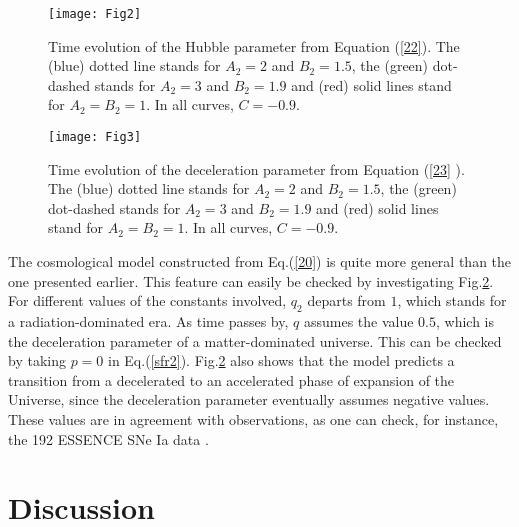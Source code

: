 \begin{figure}[ht!]
\vspace{0.3cm} \centering
\texttt{[image: Fig2]}
\caption{Time evolution of the Hubble parameter from Equation 
(\protect\ref{22}). The (blue) dotted line stands for $A_{2}=2$ and $B_{2}=1.5$, the (green) dot-dashed stands for $A_{2}=3$ and $B_{2}=1.9$ and (red) solid lines stand for $A_{2}=B_{2}=1$. In all
curves, $C=-0.9$.}
\label{fig4}
\end{figure}

\begin{figure}[ht!]
\vspace{0.3cm} \centering
\texttt{[image: Fig3]}
\caption{Time evolution of the deceleration parameter from Equation (\protect\ref{23}%
). The (blue) dotted line stands for $A_{2}=2$ and $B_{2}=1.5$, the (green) dot-dashed stands for $A_{2}=3$ and $B_{2}=1.9$ and (red) solid lines stand for $A_{2}=B_{2}=1$. In all
curves, $C=-0.9$.}
\label{fig5}
\end{figure}

The cosmological model constructed from Eq.(\ref{20}) is quite more general than the one presented earlier. This feature can easily be checked by investigating Fig.\ref{fig5}. For different values of the constants involved, $q_2$ departs from $1$, which stands for a radiation-dominated era. As time passes by, $q$ assumes the value $0.5$, which is the deceleration parameter of a matter-dominated universe. This can be checked by taking $p=0$ in Eq.(\ref{sfr2}). Fig.\ref{fig5} also shows that the model predicts a transition from a decelerated to an accelerated phase of expansion of the Universe, since the deceleration parameter eventually assumes negative values. These values are in agreement with observations, as one can check, for instance, the 192 ESSENCE SNe Ia data \cite{lu/2008}. 

\section{Discussion}

\label{sec:dis}


